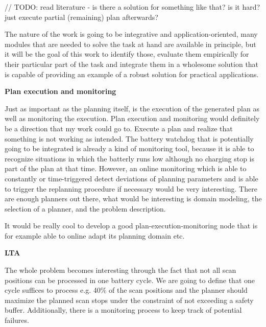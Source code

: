 \documentclass[german, master, expose, latin1]{base/thesis_KBS}
\begin{document}
// TODO: read literature - is there a solution for something like that? is it hard? just execute partial (remaining) plan afterwards?\newline

The nature of the work is going to be integrative and application-oriented, many modules that are needed to solve the task at hand are available in principle, 
but it will be the goal of this work to identify those, evaluate them empirically for their particular part of the task and integrate them in a wholesome 
solution that is capable of providing an example of a robust solution for practical applications.\newline

\textbf{Plan execution and monitoring}\newline

Just as important as the planning itself, is the execution of the generated plan as well as monitoring the execution.
Plan execution and monitoring would definitely be a direction that my work could go to.
Execute a plan and realize that something is not working as intended. The battery watchdog that is potentially going to be integrated is already a kind of monitoring
tool, because it is able to recognize situations in which the batterly runs low although no charging stop is part of the plan at that time.
However, an online monitoring which is able to constantly or time-triggered detect deviations of planning parameters and is able to trigger the replanning procedure
if necessary would be very interesting.\newline
There are enough planners out there, what would be interesting is domain modeling, the selection of a planner, and the problem description.\newline

It would be really cool to develop a good plan-execution-monitoring node that is for example able to online adapt its planning domain etc.\newline

\textbf{LTA}\newline

The whole problem becomes interesting through the fact that not all scan positions can be processed in one battery cycle.
We are going to define that one cycle suffices to process e.g. 40\% of the scan positions and the planner should maximize the planned scan stops under the
constraint of not exceeding a safety buffer. Additionally, there is a monitoring process to keep track of potential failures.\newline
\end{document}
